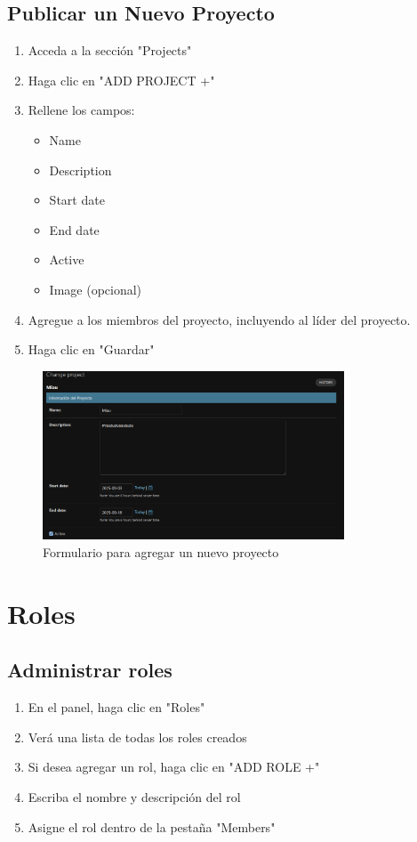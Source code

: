 \documentclass[12pt,letterpaper]{report}
\begin{document}
\subsection{Publicar un Nuevo Proyecto}
\begin{enumerate}
    \item Acceda a la sección "Projects"
    \item Haga clic en "ADD PROJECT +"
    \item Rellene los campos:
        \begin{itemize}
            \item Name
            \item Description
            \item Start date
            \item End date
            \item Active
            \item Image (opcional)
        \end{itemize}
        \item Agregue a los miembros del proyecto, incluyendo al líder del proyecto.
    \item Haga clic en "Guardar"
\end{enumerate}

\begin{figure}[H]
    \centering
    \includegraphics[width=0.8\textwidth]{images/projects.png}
    \caption{Formulario para agregar un nuevo proyecto}
\end{figure}

\section{Roles}
\subsection{Administrar roles}
\begin{enumerate}
    \item En el panel, haga clic en "Roles"
    \item Verá una lista de todas los roles creados
    \item Si desea agregar un rol, haga clic en "ADD ROLE +"
    \item Escriba el nombre y descripción del rol
    \item Asigne el rol dentro de la pestaña "Members"
\end{enumerate}
\end{document}
